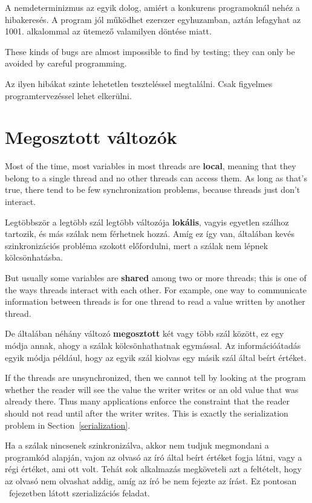 \documentclass{book}
\begin{document}
A nemdeterminizmus az egyik dolog, amiért a konkurens
programoknál nehéz a hibakeresés. A program jól működhet
ezerszer egyhuzamban, aztán lefagyhat az 1001. alkalommal
az ütemező valamilyen döntése miatt.

These kinds of bugs are almost impossible to find by testing;
they can only be avoided by careful programming.

Az ilyen hibákat szinte lehetetlen teszteléssel megtalálni.
Csak figyelmes programtervezéssel lehet elkerülni.

\section{Megosztott változók}
\label{shared}

Most of the time, most variables in most threads are {\bf local},
meaning that they belong to a single thread and no other threads
can access them.  As long as that's true, there tend to be few
synchronization problems, because threads just don't interact.

Legtöbbször a legtöbb szál legtöbb változója {\bf lokális}, vagyis
egyetlen szálhoz tartozik, és más szálak nem férhetnek hozzá.
Amíg ez így van, általában kevés szinkronizációs probléma
szokott előfordulni, mert a szálak nem lépnek kölcsönhatásba.

But usually some variables are {\bf shared} among two or more
threads; this is one of the ways threads interact with each other.
For example, one way to communicate information between threads is
for one thread to read a value written by another thread.

De általában néhány változó {\bf megosztott} két vagy több szál
között, ez egy módja annak, ahogy a szálak kölcsönhathatnak
egymással. Az információátadás egyik módja például, hogy
az egyik szál kiolvas egy másik szál által beírt értéket.

If the threads are unsynchronized, then we cannot tell by looking at
the program whether the reader will see the value the writer writes
or an old value that was already there.
Thus many applications enforce the constraint that the reader
should not read until after the writer writes.  This is exactly
the serialization problem in Section~\ref{serialization}.

Ha a szálak nincsenek szinkronizálva, akkor nem tudjuk megmondani
a programkód alapján, vajon az olvasó az író által beírt értéket
fogja látni, vagy a régi értéket, ami ott volt.
Tehát sok alkalmazás megköveteli azt a feltételt, hogy az
olvasó nem olvashat addig, amíg az író be nem fejezte az írást.
Ez pontosan ~fejezetben látott szerializációs
feladat.
\end{document}
